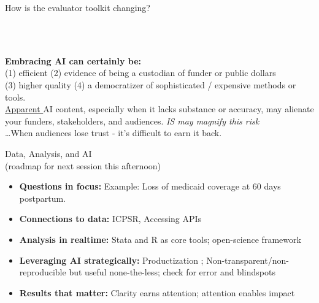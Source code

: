\documentclass[aspectratio=169, 10pt]{beamer}
\begin{document}
\begin{frame}[fragile]{How is the evaluator toolkit changing?}

{} \\[2em]
\pause

    \centering
 {   }\\
  \flushleft
\vfill  \pause 
\textbf{ Embracing AI can certainly be:} \\ \hspace{.38em} (1)  efficient (2)  evidence of being a custodian of funder or public dollars \\ \hspace{.38em}  (3)  higher quality  (4) a democratizer of sophisticated / expensive methods or tools.\\[1.25em]
  
  \underline{Apparent }AI content, especially when it lacks substance or accuracy, may alienate your funders, stakeholders, and audiences. \textit{IS may magnify this risk} \\[1em]
  \pause
  \hfill \ldots When audiences lose trust - it's difficult to earn it back. \\[1em]

\end{frame}


\begin{frame}{Data, Analysis, and AI \\ \small(roadmap for next session this afternoon)}
    \begin{itemize}
        \item \textbf{Questions in focus:} Example: Loss of medicaid coverage at 60 days postpartum.
        \item \textbf{Connections to data:} ICPSR, Accessing APIs 
        \item \textbf{Analysis in realtime:} Stata and R as core tools; open-science framework
        \item \textbf{Leveraging AI strategically:} Productization ; Non-transparent/non-reproducible but useful none-the-less; check for error and blindspots
        \item \textbf{Results that matter:} Clarity earns attention; attention enables impact 
 
    \end{itemize}

\end{frame}
\end{document}
